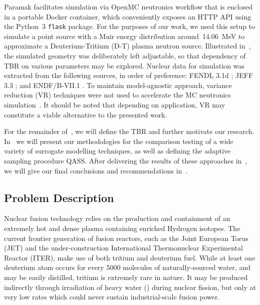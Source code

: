 Paramak facilitates simulation via OpenMC neutronics workflow that is enclosed in
a portable Docker container, which conveniently exposes an HTTP API using the
Python~3 \texttt{flask} package. For the purposes of our work, we used this setup to
simulate a point source with a Muir energy distribution \cite{openmcmuir}\footnotemark[1]
around~\SI{14.06}{\mega\electronvolt} to approximate a Deuterium-Tritium (D-T)
plasma neutron source. Illustrated in~, the simulated
geometry was deliberately left adjustable, so that dependency of TBR on various
parameters may be explored. Nuclear data for simulation was extracted from the following sources, in order of preference: FENDL 3.1d \cite{fendl31d}; JEFF 3.3 \cite{jeff33}; and ENDF/B-VII.1 \cite{2011ii}.
To maintain model-agnostic approach, variance reduction (VR) techniques
were not used to accelerate the MC neutronics simulation~\cite{Kleijnen2013}.
It should be noted that depending on application, VR may constitute a viable
alternative to the presented work.

For the remainder of~, we will define the TBR and further motivate our
research. In~ we will present our methodologies for the comparison
testing of a wide variety of surrogate modelling techniques, as well as defining the adaptive sampling procedure QASS. After delivering the
results of these approaches in~, we will give our final conclusions and
recommendations in~.



\subsection{Problem Description}
\label{sec:problemdescription}

Nuclear fusion technology relies on the production and containment of an
extremely hot and dense plasma containing enriched Hydrogen isotopes. The current frontier generation of fusion reactors, such as the Joint European Torus (JET) and the
under-construction International Thermonuclear Experimental Reactor (ITER), make
use of both tritium and deuterium fuel. While at least one deuterium atom occurs for every \num{5000} molecules of naturally-sourced water, and may be easily distilled, tritium is extremely rare in nature. It may be produced indirectly through irradiation of heavy water
(\DDO) during nuclear fission, but only at very low rates which could
never sustain industrial-scale fusion power.

